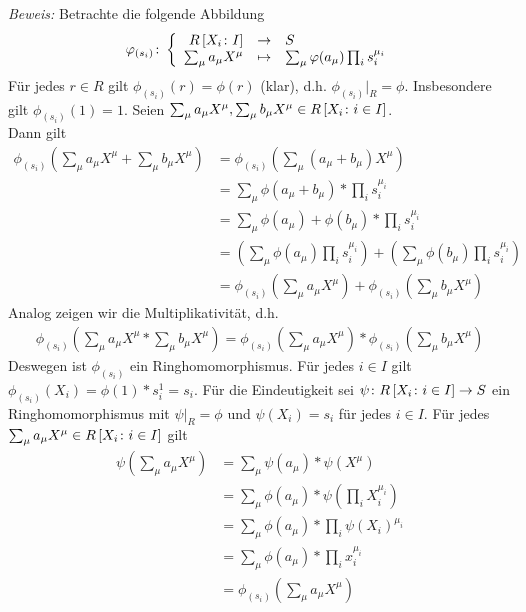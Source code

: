 \begin{exercisePage}
\begin{solution}
        \textit{Beweis:} Betrachte die folgende Abbildung
        \begin{align*}
            \bigabb{\phi_{(s_i)}}{\polynomring{R}{X_i \colon I}}{S}%
                                 {\sum_\mu a_\mu X^\mu}        {\sum_\mu \phi(a_\mu) \prod_i s_i ^{\mu_i}}
        \end{align*}
       Für jedes $r \in R$ gilt $\phi_{(s_i)}(r) = \phi(r)$ (klar), d.h. $\phi_{(s_i)} |_R = \phi$. Insbesondere gilt $\phi_{(s_i)}(1) = 1$. Seien $\sum_\mu a_\mu X^\mu, \sum_\mu b_\mu X^\mu \in R \left[ X_i \colon i \in I \right]$. \\
       Dann gilt
       \begin{align*}
           \phi_{(s_i)} \left( \sum_\mu a_\mu X^\mu + \sum_\mu b_\mu X^\mu \right) 
           &= \phi_{(s_i)} \left( \sum_\mu (a_\mu + b_\mu) X^\mu \right) \\
           &= \sum_\mu \phi(a_\mu + b_\mu) * \prod_i s_i^{\mu_i} \\
           &= \sum_\mu \phi(a_\mu) + \phi(b_\mu) * \prod_i s_i^{\mu_i} \\
           &= \left( \sum_\mu \phi(a_\mu) \prod_i s_i^{\mu_i} \right) + \left( \sum_\mu \phi(b_\mu) \prod_i s_i^{\mu_i} \right) \\
           &= \phi_{(s_i)} \left( \sum_\mu a_\mu X^\mu \right) +  \phi_{(s_i)} \left( \sum_\mu b_\mu X^\mu \right)
       \end{align*}
       Analog zeigen wir die Multiplikativität, d.h. 
       \begin{align*}
           \phi_{(s_i)} \left( \sum_\mu a_\mu X^\mu * \sum_\mu b_\mu X^\mu \right) = \phi_{(s_i)} \left( \sum_\mu a_\mu X^\mu \right) *  \phi_{(s_i)} \left( \sum_\mu b_\mu X^\mu \right)
       \end{align*}
       Deswegen ist $\phi_{(s_i)}$ ein Ringhomomorphismus. Für jedes $i \in I$ gilt $\phi_{(s_i)}(X_i) = \phi(1) * s_i^1 = s_i$.
       Für die Eindeutigkeit sei $\psi \colon R \left[ X_i \colon i \in I \right] \to S$ ein Ringhomomorphismus mit $\psi |_R = \phi$ und $\psi(X_i) = s_i$ für jedes $i \in I$. Für jedes $\sum_\mu a_\mu X^\mu \in R \left[ X_i \colon i \in I \right]$ gilt
       \begin{align*}
           \psi \left( \sum_\mu a_\mu X^\mu \right) 
           &= \sum_\mu \psi(a_\mu)  * \psi \left( X^\mu \right) \\
           &= \sum_\mu \phi(a_\mu) * \psi \left( \prod_i X_i^{\mu_i} \right) \\
           &= \sum_\mu \phi(a_\mu) * \prod_i \psi(X_i)^{\mu_i} \\
           &= \sum_\mu \phi(a_\mu) * \prod_i x_i^{\mu_i} \\
           &= \phi_{(s_i)} \left( \sum_\mu a_\mu X^\mu \right)
       \end{align*}
    \end{solution}
    \undef\RXi
    

\end{exercisePage}
